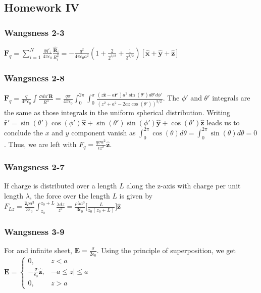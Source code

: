 \documentclass[oneside]{book}
\theoremstyle{definition}
\newcommand*\B[1]{\mathbf{#1}}
\newcommand*\Bh[1]{\mathbf{\hat{#1}}}
\begin{document}
\subsection*{Homework IV}

\subsubsection{Wangsness 2-3}

\begin{figure}[!h]
  \centering
  \hfill
  \hfill
\end{figure}

$\B{F}_q = \sum_{i=1}^{N} \frac{qq'_i}{4\pi \epsilon_0} \frac{\Bh{R}_i}{R_i^2} = -\frac{q^2}{4\pi \epsilon_0 a^2} (1+\frac{2}{2^{3/2}}+\frac{1}{3^{3/2}})[\Bh{x}+\Bh{y}+\Bh{z}]$

\subsubsection{Wangsness 2-8}

$\B{F}_q = \frac{q}{4\pi \epsilon_0} \int \frac{\sigma da'\B{R}}{R^3}=\frac{q\sigma}{4\pi \epsilon_0} \int_{0}^{2\pi} \int_{0}^{\pi} \frac{(z\Bh{z}-a\Bh{r}')a^2\sin(\theta')d\theta ' d\phi '}{(z^2+a^2-2az\cos(\theta'))^{3/2}}$. The $\phi'$ and $\theta'$ integrals are the same as those integrals in the uniform spherical distribution. Writing $\Bh{r}' = \sin(\theta')\cos(\phi')\Bh{x} + \sin(\theta')\sin(\phi')\Bh{y}+\cos(\theta')\Bh{z}$ leads us to conclude the $x$ and $y$ component vanish as $\int_{0}^{2\pi} \cos(\theta) d\theta = \int_{0}^{2\pi} \sin(\theta) d\theta = 0$. Thus, we are left with $F_q = \frac{q\sigma a^2}{\epsilon z^2}\Bh{z}$.

\subsubsection{Wangsness 2-7}

If charge is distributed over a length $L$ along the z-axis with charge per unit length $\lambda$, the force over the length $L$ is given by $F_{Lz} = \frac{\Bh{z}\rho a^3}{3\epsilon_0} \int_{z_0}^{z_0+L} \frac{\lambda dz}{z^2} = \frac{\rho \lambda a^3}{3\epsilon_0}\big[ \frac{L}{z_0(z_0+L)}\big] \Bh{z}$

\subsubsection{Wangsness 3-9}
For and infinite sheet, $\B{E} = \frac{\sigma}{2\epsilon_0}$. Using the principle of superposition, we get $\B{E} = \begin{cases} 0, & z<a \\ -\frac{\sigma}{\epsilon_0}\Bh{z},& -a\leq z|\leq a \\ 0,& z>a\end{cases}$
\end{document}
